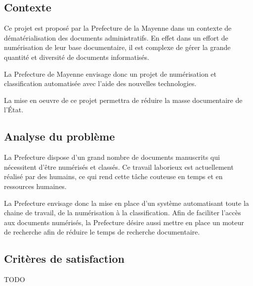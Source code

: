 

\subsection {Contexte}

Ce projet est proposé par la Prefecture de la Mayenne dans un contexte de dématérialisation des documents administratifs.
En effet dans un effort de numérisation de leur base documentaire, il est complexe de gérer la grande quantité et diversité de documents informatisés. 

\par
La Prefecture de Mayenne envisage donc un projet de numérisation et classification automatisée avec l'aide des nouvelles technologies.

La mise en oeuvre de ce projet permettra de réduire la masse documentaire de l'État.


\subsection {Analyse du problème}
La Prefecture dispose d'un grand nombre de documents manuscrits qui nécessitent d'être numérisés et classés.
Ce travail laborieux est actuellement réalisé par des humains, ce qui rend cette tâche couteuse en temps et en ressources humaines.


La Prefecture envisage donc la mise en place d'un système automatisant toute la chaine de travail, de la numérisation à la classification.
Afin de faciliter l'accès aux documents numérisés, la Prefecture désire aussi mettre en place un moteur de recherche afin de réduire le temps de recherche documentaire.


\subsection {Critères de satisfaction}
TODO


